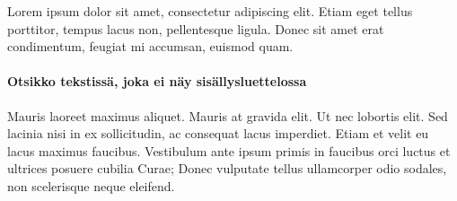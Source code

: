 \label{Alinotsikko}

Lorem ipsum dolor sit amet, consectetur adipiscing elit. Etiam eget
tellus porttitor, tempus lacus non, pellentesque ligula. Donec sit
amet erat condimentum, feugiat mi accumsan, euismod quam.

\paragraph{Otsikko tekstissä, joka ei näy sisällysluettelossa}

Mauris laoreet maximus aliquet. Mauris at gravida elit. Ut nec lobortis
elit. Sed lacinia nisi in ex sollicitudin, ac consequat lacus imperdiet.
Etiam et velit eu lacus maximus faucibus. Vestibulum ante ipsum primis
in faucibus orci luctus et ultrices posuere cubilia Curae; Donec vulputate
tellus ullamcorper odio sodales, non scelerisque neque eleifend. 
